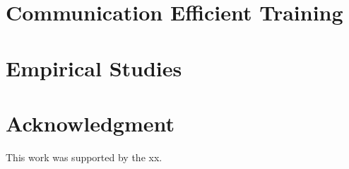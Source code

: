 \documentclass[journal]{IEEEtran}
\begin{document}
\section{Communication Efficient Training}








\section{Empirical Studies}









\section*{Acknowledgment}
This work was supported by the xx. 



%  
%


\end{document}

